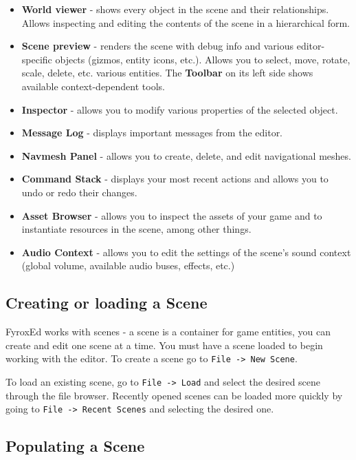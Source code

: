 \documentclass[
]{book}
\providecommand{\tightlist}{%
  \setlength{\itemsep}{0pt}\setlength{\parskip}{0pt}}
\theoremstyle{definition}
\theoremstyle{definition}
\theoremstyle{definition}
\theoremstyle{definition}
\theoremstyle{remark}
\begin{document}
\begin{itemize}
\tightlist
\item
  \textbf{World viewer} - shows every object in the scene and their relationships. Allows inspecting and editing the contents of the scene in a hierarchical form.
\item
  \textbf{Scene preview} - renders the scene with debug info and various editor-specific objects (gizmos, entity icons, etc.). Allows you to select, move, rotate, scale, delete, etc. various entities. The \textbf{Toolbar} on its left side shows available context-dependent tools.
\item
  \textbf{Inspector} - allows you to modify various properties of the selected object.
\item
  \textbf{Message Log} - displays important messages from the editor.
\item
  \textbf{Navmesh Panel} - allows you to create, delete, and edit navigational meshes.
\item
  \textbf{Command Stack} - displays your most recent actions and allows you to undo or redo their changes.
\item
  \textbf{Asset Browser} - allows you to inspect the assets of your game and to instantiate resources in the scene, among other things.
\item
  \textbf{Audio Context} - allows you to edit the settings of the scene's sound context (global volume, available audio buses, effects, etc.)
\end{itemize}

\subsection{Creating or loading a Scene}\label{creating-or-loading-a-scene}

FyroxEd works with scenes - a scene is a container for game entities, you can create and edit one scene at a time. You must have a scene loaded to begin working with the editor. To create a scene go to \texttt{File\ -\textgreater{}\ New\ Scene}.

To load an existing scene, go to \texttt{File\ -\textgreater{}\ Load} and select the desired scene through the file browser. Recently opened scenes can be loaded more quickly by going to \texttt{File\ -\textgreater{}\ Recent\ Scenes} and selecting the desired one.

\subsection{Populating a Scene}\label{populating-a-scene}
\end{document}
